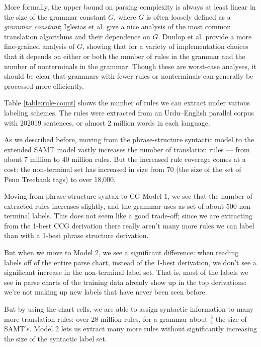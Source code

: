 \documentclass[a4paper]{article}
\begin{document}
More formally, the upper bound on parsing complexity is always at
least linear in the size of the grammar constant $G$, where $G$ is
often loosely defined as a {\it grammar constant}; Iglesias et al.
 give a nice analysis of the most common translation algorithms
and their dependence on $G$. Dunlop et al.  provide a more
fine-grained analysis of $G$, showing that for a variety of
implementation choices that it depends on either or both the number of
rules in the grammar and the number of nonterminals in the grammar.
Though these are worst-case analyses, it should be clear that grammars
with fewer rules or nonterminals can generally be processed more
efficiently.

Table \ref{table:rule-count} shows the number of rules we can extract under various labeling schemes. The rules were extracted from an Urdu--English parallel corpus with 202019 sentences, or almost 2 million words in each language.

As we described before, moving from the phrase-structure syntactic model to the extended SAMT model vastly increases the number of translation rules --- from about 7 million to 40 million rules. But the increased rule coverage comes at a cost: the non-terminal set has increased in size from 70 (the size of the set of Penn Treebank tags) to over 18,000.

Moving from phrase structure syntax to CG Model 1, we see that the number of extracted rules increases slightly, and the grammar uses as set of about 500 non-terminal labels. This does not seem like a good trade-off; since we are extracting from the 1-best CCG derivation there really aren't many more rules we can label than with a 1-best phrase structure derivation.

But when we move to Model 2, we see a significant difference: when reading labels off of the entire parse chart, instead of the 1-best derivation, we don't see a significant increase in the non-terminal label set. That is, most of the labels we see in parse charts of the training data already show up in the top derivations: we're not making up new labels that have never been seen before.

But by using the chart cells, we are able to assign syntactic information to many more translation rules: over 28 million rules, for a grammar about $\frac{3}{4}$ the size of SAMT's. Model 2 lets us extract many more rules without significantly increasing the size of the syntactic label set.
\end{document}
